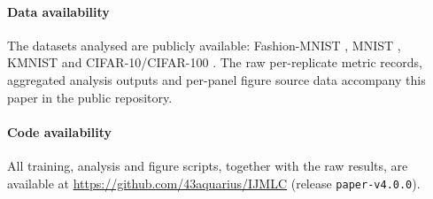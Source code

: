 \documentclass[11pt,a4paper]{article}
\begin{document}
\paragraph{Data availability}
The datasets analysed are publicly available: Fashion-MNIST
\citep{xiao2017}, MNIST \citep{lecun1998}, KMNIST \citep{clanuwat2018}
and CIFAR-10/CIFAR-100 \citep{krizhevsky2009}.
The raw per-replicate metric records, aggregated analysis outputs and
per-panel figure source data accompany this paper in the public
repository.

\paragraph{Code availability}
All training, analysis and figure scripts, together with the raw results,
are available at \url{https://github.com/43aquarius/IJMLC} (release
\texttt{paper-v4.0.0}).
\end{document}
